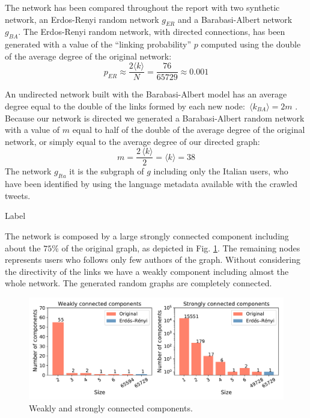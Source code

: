 \documentclass[11pt, twoside]{report}
\begin{document}
The network has been compared throughout the report with two synthetic network, an Erdos-Renyi random network $g_{ER}$ and a Barabasi-Albert network $g_{BA}$. The Erdos-Renyi random network, with directed connections, has been generated with a value of the ``linking probability'' $p$ computed using the double of the average degree of the original network:
    \begin{equation}
      p_{ER} \approx \frac{2\langle k  \rangle}{N} = \frac{76}{65729} \approx  0.001
      \label{eq:ER_probability}
    \end{equation}

 An undirected network built with the Barabasi-Albert model  has an average degree equal to the double of the links formed by each new node: $ \, \langle k_{BA} \rangle = 2 m$ \cite{network_science}. Because our network is directed we generated a Barabasi-Albert random network with a value of $m$ equal to half of the double of the average degree of the original network, or simply equal to the average degree of our directed graph:
    \begin{equation}
      m = \frac{ 2 \, \langle k \rangle}{2} =  \langle k \rangle = 38
      \label{eq:BA_model}
    \end{equation}
    The network $g_{Ita}$ it is the subgraph of $g$ including only the Italian users, who have been identified by using the language metadata available with the crawled tweets.


\begin{table}[htbp]
  \centering
  
  \label{tab:summary}
  \caption{Label}
\end{table}

The network is composed by a large strongly connected component including about the $75\%$ of the original graph, as depicted in Fig. \ref{fig:components}. The remaining nodes represents users who follows only few authors of the graph. Without considering the directivity of the links
we have a weakly component including almost the whole network. The generated random graphs are completely connected.


    \begin{figure}[H]
      \centering
      \includegraphics[width=\textwidth]{../../scripts/network_analysis/imgs/connectivity.pdf}            
      \caption{Weakly and strongly connected components.}
      \label{fig:components}
    \end{figure}
\end{document}
